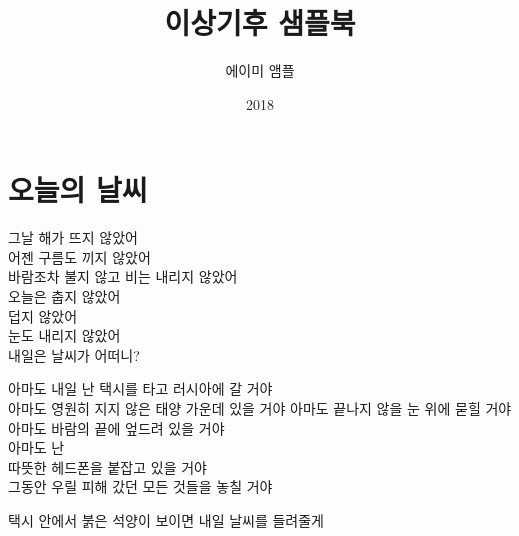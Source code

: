 \documentclass[12pt, b6paper, openany]{memoir}
\title{이상기후 샘플북}
\author{에이미 앰플}
\date{2018}
\makeatletter
\newcommand*{\cleartorightpage}{\clearpage\if@twoside\ifeven\c@page\hbox{}\newpage\if@twocolumn\hbox{}\newpage\fi\fi\fi}
\newenvironment{lyric}{\setlength{\parindent}{0pt}}{}
\makeatother
\begin{document}
    
    \frontmatter
    \begin{titlingpage}
    \maketitle
    \end{titlingpage}
    
    \cleartorightpage
    
      \tableofcontents
      
    \mainmatter
    \begin{lyric}
    \hypertarget{uxc624uxb298uxc758-uxb0a0uxc528}{%
    \chapter{오늘의 날씨}\label{uxc624uxb298uxc758-uxb0a0uxc528}}
    
    그날 해가 뜨지 않았어\\
    어젠 구름도 끼지 않았어\\
    바람조차 불지 않고 비는 내리지 않았어\\
    오늘은 춥지 않았어\\
    덥지 않았어\\
    눈도 내리지 않았어\\
    내일은 날씨가 어떠니?
    
    아마도 내일 난 택시를 타고 러시아에 갈 거야\\
    아마도 영원히 지지 않은 태양 가운데 있을 거야 아마도 끝나지 않을 눈 위에 묻힐 거야\\
    아마도 바람의 끝에 엎드려 있을 거야\\
    아마도 난\\
    따뜻한 헤드폰을 붙잡고 있을 거야\\
    그동안 우릴 피해 갔던 모든 것들을 놓칠 거야
    
    택시 안에서 붉은 석양이 보이면 내일 날씨를 들려줄게
    \end{lyric}
    
\end{document}
